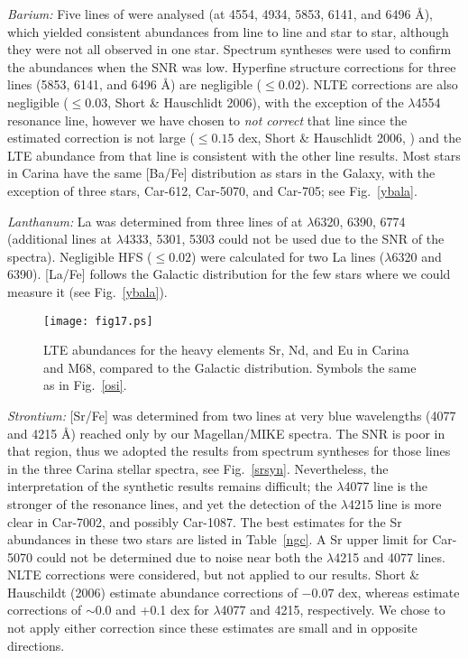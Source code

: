 \documentclass{emulateapj}
\begin{document}
{\it Barium:}
Five lines of  were analysed 
(at 4554, 4934, 5853, 6141, and 6496 \AA), 
which yielded consistent abundances from line to line and star to star, 
although they were not all observed in one star.
Spectrum syntheses were used to confirm the abundances when 
the SNR was low.  Hyperfine structure corrections for three lines 
(5853, 6141, and 6496 \AA) are negligible ($\le0.02$).
NLTE corrections are also negligible ($\le0.03$, Short \& Hauschlidt 2006), 
with the exception of the $\lambda$4554 resonance line, however we have 
chosen to {\it not correct} that line since the estimated correction 
is not large ($\le0.15$ dex, Short \& Hauschlidt 2006, \citealt{And09}) 
and the LTE abundance from that line is consistent with the other  
line results.
%
Most stars in Carina have the same [Ba/Fe] distribution as
stars in the Galaxy, with the exception of three stars,
Car-612, Car-5070, and Car-705; see Fig.~\ref{ybala}. 


{\it Lanthanum:} La was determined from three lines of  at 
$\lambda$6320, 6390, 6774 (additional lines at $\lambda$4333, 5301, 5303 
could not be used due to the SNR of the spectra).  Negligible 
HFS ($\le 0.02$) were calculated for 
two La lines ($\lambda$6320 and 6390).  [La/Fe] follows the
Galactic distribution for the few stars where we could 
measure it (see Fig.~\ref{ybala}).




\begin{figure}[t]
\texttt{[image: fig17.ps]}
\caption{LTE abundances for the heavy elements 
Sr, Nd, and Eu in Carina and M68, compared to the Galactic 
distribution.  
Symbols the same as in Fig.~\ref{osi}. \\
}
\label{srndeu}
\end{figure}




{\it Strontium:} 
[Sr/Fe] was determined from two  lines at very blue wavelengths
(4077 and 4215 \AA) reached only by our Magellan/MIKE spectra.   
The SNR is poor in that region, thus we adopted the results from 
spectrum syntheses for those lines in the three Carina stellar spectra, 
see Fig.~\ref{srsyn}.   Nevertheless, the interpretation of the synthetic
results remains difficult; the $\lambda$4077 line is the stronger of the
 resonance lines, and yet the detection of the $\lambda$4215 line 
is more clear in Car-7002, and possibly Car-1087. 
The best estimates for the Sr abundances
in these two stars are listed in Table~\ref{ngc}.
A Sr upper limit for Car-5070 could not be determined due to
noise near both the $\lambda$4215 and 4077 lines.
%
NLTE corrections were considered, but not applied to our results.
Short \& Hauschildt (2006) estimate abundance corrections of $-0.07$ dex, 
whereas \citep{And11} 
estimate corrections of $\sim 0.0$ and +0.1 dex for $\lambda$4077 and
4215, respectively.   We chose to not apply either correction 
since these estimates are small and in opposite directions. 
\end{document}
